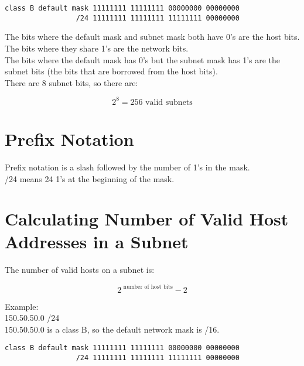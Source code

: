 \documentclass{article}
\begin{document}
\begin{verbatim}
class B default mask 11111111 11111111 00000000 00000000
                 /24 11111111 11111111 11111111 00000000
\end{verbatim}

The bits where the default mask and subnet mask both have 0's are the host
bits.\\

The bits where they share 1's are the network bits.\\

The bits where the default mask has 0's but the subnet mask has 1's are the
subnet bits (the bits that are borrowed from the host bits).\\

There are 8 subnet bits, so there are:

\begin{equation}
2 ^ 8 = 256 \mbox{ valid subnets}
\end{equation}

\section{Prefix Notation}

Prefix notation is a slash followed by the number of 1's in the mask.\\

/24 means 24 1's at the beginning of the mask.

\section{Calculating Number of Valid Host Addresses in a Subnet}

The number of valid hosts on a subnet is:

\begin{equation}
2 ^ {\mbox{ number of host bits}} - 2
\end{equation}

Example:\\

150.50.50.0 /24\\

150.50.50.0 is a class B, so the default network mask is /16.

\begin{verbatim}
class B default mask 11111111 11111111 00000000 00000000
                 /24 11111111 11111111 11111111 00000000
\end{verbatim}
\end{document}
